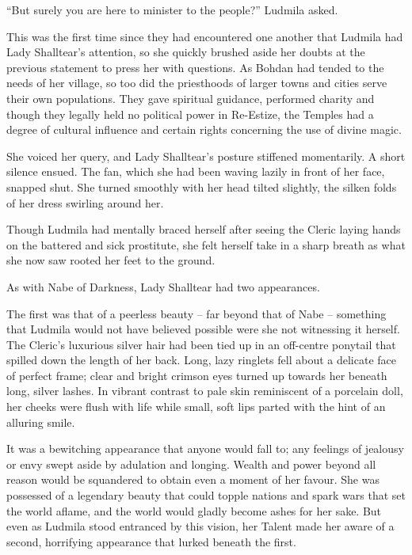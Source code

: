  

“But surely you are here to minister to the people?” Ludmila asked.

 

This was the first time since they had encountered one another that Ludmila had Lady Shalltear’s attention, so she quickly brushed aside her doubts at the previous statement to press her with questions. As Bohdan had tended to the needs of her village, so too did the priesthoods of larger towns and cities serve their own populations. They gave spiritual guidance, performed charity and though they legally held no political power in Re-Estize, the Temples had a degree of cultural influence and certain rights concerning the use of divine magic.

 

She voiced her query, and Lady Shalltear's posture stiffened momentarily. A short silence ensued. The fan, which she had been waving lazily in front of her face, snapped shut. She turned smoothly with her head tilted slightly, the silken folds of her dress swirling around her.

 

Though Ludmila had mentally braced herself after seeing the Cleric laying hands on the battered and sick prostitute, she felt herself take in a sharp breath as what she now saw rooted her feet to the ground.

 

As with Nabe of Darkness, Lady Shalltear had two appearances.

 

The first was that of a peerless beauty – far beyond that of Nabe – something that Ludmila would not have believed possible were she not witnessing it herself. The Cleric’s luxurious silver hair had been tied up in an off-centre ponytail that spilled down the length of her back. Long, lazy ringlets fell about a delicate face of perfect frame; clear and bright crimson eyes turned up towards her beneath long, silver lashes. In vibrant contrast to pale skin reminiscent of a porcelain doll, her cheeks were flush with life while small, soft lips parted with the hint of an alluring smile.

 

It was a bewitching appearance that anyone would fall to; any feelings of jealousy or envy swept aside by adulation and longing. Wealth and power beyond all reason would be squandered to obtain even a moment of her favour. She was possessed of a legendary beauty that could topple nations and spark wars that set the world aflame, and the world would gladly become ashes for her sake. But even as Ludmila stood entranced by this vision, her Talent made her aware of a second, horrifying appearance that lurked beneath the first.

